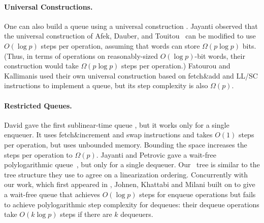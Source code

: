 



\paragraph{Universal Constructions.}
One can also build a queue using a universal construction \cite{10.1145/114005.102808}.
Jayanti \cite{DBLP:conf/podc/Jayanti98a} observed that
the universal construction of Afek, Dauber, and
Touitou~\cite{DBLP:conf/stoc/AfekDT95} can be modified to use $O(\log p)$ steps per operation, 
assuming that words can store $\Omega(p \log p)$ bits. 
(Thus, in terms of operations on reasonably-sized $O(\log p)$-bit words, their construction would take $\Omega(p\log p)$ steps per operation.)
Fatourou and Kallimanis \cite{FK14} used their own universal construction based on fetch\&add and LL/SC instructions
to implement a queue, but its step complexity is also $\Omega(p)$.

\paragraph{Restricted Queues.}
David gave the first sublinear-time queue
\cite{DBLP:conf/wdag/David04}, but it works only for a single enqueuer.
It uses fetch\&increment and swap  instructions and takes $O(1)$ steps per operation, but
uses unbounded memory.  Bounding the space increases the steps per operation to $\Omega(p)$.
Jayanti and Petrovic gave a wait-free polylogarithmic
queue~\cite{DBLP:conf/fsttcs/JayantiP05}, but only for a single dequeuer. 
Our \ordering\ tree is similar to the tree structure they use to agree on a linearization ordering.
Concurrently with our work, which first appeared in \cite{Nad22}, Johnen, Khattabi and Milani \cite{JKM23} built on \cite{DBLP:conf/fsttcs/JayantiP05} to give a wait-free queue  
that achieves $O(\log p)$ steps for enqueue operations but fails to achieve polylogarithmic step complexity for dequeues: their dequeue operations take $O(k \log p)$ steps if there are $k$ dequeuers.

